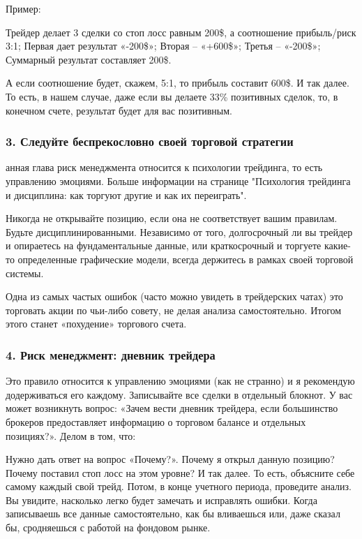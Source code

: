 \documentclass[a5paper]{article}
\begin{document}
Пример:

    Трейдер делает 3 сделки со стоп лосс равным 200\$, а соотношение прибыль/риск 3:1;
    Первая дает результат «-200\$»;
    Вторая – «+600\$»;
    Третья – «-200\$»;
    Суммарный результат составляет 200\$.

А если соотношение будет, скажем, 5:1, то прибыль составит 600\$. И так далее. То есть, в нашем случае, даже если вы делаете 33\% позитивных сделок, то, в конечном счете, результат будет для вас позитивным.

\subsubsection{3. Следуйте беспрекословно своей торговой стратегии}

анная глава риск менеджмента относится к психологии трейдинга, то есть управлению эмоциями. Больше информации на странице "Психология трейдинга и дисциплина: как торгуют другие и как их переиграть".

Никогда не открывайте позицию, если она не соответствует вашим правилам. Будьте дисциплинированными. Независимо от того, долгосрочный ли вы трейдер и опираетесь на фундаментальные данные, или краткосрочный и торгуете какие-то определенные графические модели, всегда держитесь в рамках своей торговой системы.

Одна из самых частых ошибок (часто можно увидеть в трейдерских чатах)
это торговать акции по чьи-либо совету, не делая анализа
самостоятельно. Итогом этого станет «похудение» торгового счета.

\subsubsection{4. Риск менеджмент: дневник трейдера}

Это правило относится к управлению эмоциями (как не странно) и я рекомендую додерживаться его каждому. Записывайте все сделки в отдельный блокнот. У вас может возникнуть вопрос: «Зачем вести дневник трейдера, если большинство брокеров предоставляет информацию о торговом балансе и отдельных позициях?». Делом в том, что:

    Нужно дать ответ на вопрос «Почему?». Почему я открыл данную позицию? Почему поставил стоп лосс на этом уровне? И так далее. То есть, объясните себе самому каждый свой трейд. Потом, в конце учетного периода, проведите анализ. Вы увидите, насколько легко будет замечать и исправлять ошибки.
    Когда записываешь все данные самостоятельно, как бы вливаешься
    или, даже сказал бы, сродняешься с работой на фондовом рынке.
\end{document}
